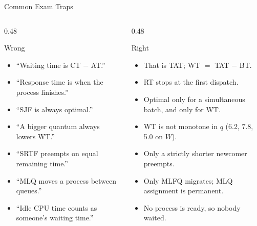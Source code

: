 \documentclass[aspectratio=169]{beamer}
\begin{document}
\begin{frame}{Common Exam Traps}
  \footnotesize
  \begin{columns}[T]
    \begin{column}{0.48\textwidth}
      \begin{block}{Wrong}
        \begin{itemize}
          \item ``Waiting time is CT $-$ AT.''
          \item ``Response time is when the process finishes.''
          \item ``SJF is always optimal.''
          \item ``A bigger quantum always lowers WT.''
          \item ``SRTF preempts on equal remaining time.''
          \item ``MLQ moves a process between queues.''
          \item ``Idle CPU time counts as someone's waiting time.''
        \end{itemize}
      \end{block}
    \end{column}
    \begin{column}{0.48\textwidth}
      \begin{block}{Right}
        \begin{itemize}
          \item That is TAT; WT $=$ TAT $-$ BT.
          \item RT stops at the first dispatch.
          \item Optimal only for a simultaneous batch, and only for WT.
          \item WT is not monotone in $q$ (6.2, 7.8, 5.0 on $W$).
          \item Only a strictly shorter newcomer preempts.
          \item Only MLFQ migrates; MLQ assignment is permanent.
          \item No process is ready, so nobody waited.
        \end{itemize}
      \end{block}
    \end{column}
  \end{columns}
\end{frame}

\end{document}
